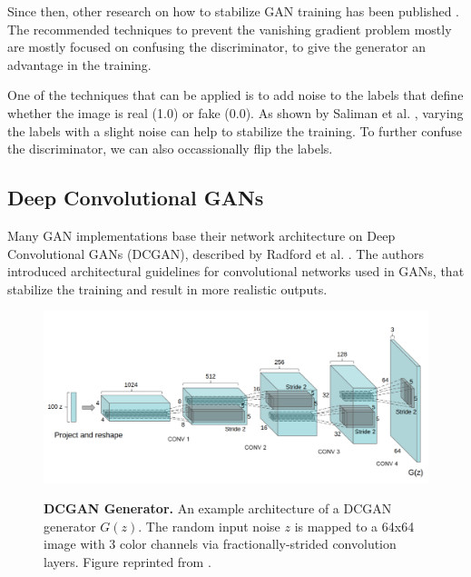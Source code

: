 \documentclass[12pt]{report}
\begin{document}
Since then, other research on how to stabilize GAN training has been published \cite{arjovsky_towards_2017}\cite{roth_stabilizing_2017}\cite{salimans_improved_2016}. The recommended techniques to prevent the vanishing gradient problem mostly are mostly focused on confusing the discriminator, to give the generator an advantage in the training. 

One of the techniques that can be applied is to add noise to the labels that define whether the image is real (1.0) or fake (0.0). As shown by Saliman et al. \cite{salimans_improved_2016}, varying the labels with a slight noise can help to stabilize the training. To further confuse the discriminator, we can also occassionally flip the labels. 

\subsection{Deep Convolutional GANs} \label{sec:dcgan}


Many GAN implementations base their network architecture on Deep Convolutional GANs (DCGAN), described by Radford et al. \cite{radford_unsupervised_2015}. The authors introduced architectural guidelines for convolutional networks used in GANs, that stabilize the training and result in more realistic outputs.

\begin{figure}[h]
\centering
{\includegraphics[width=\linewidth]{02_background/dcgan_generator}}
\caption{\label{fig:dcgan} \textbf{DCGAN Generator.} An example architecture of a DCGAN generator $G(z)$. The random input noise $z$ is mapped to a 64x64 image with 3 color channels via fractionally-strided convolution layers. Figure reprinted from \cite{radford_unsupervised_2015}.}
\end{figure}
\end{document}

